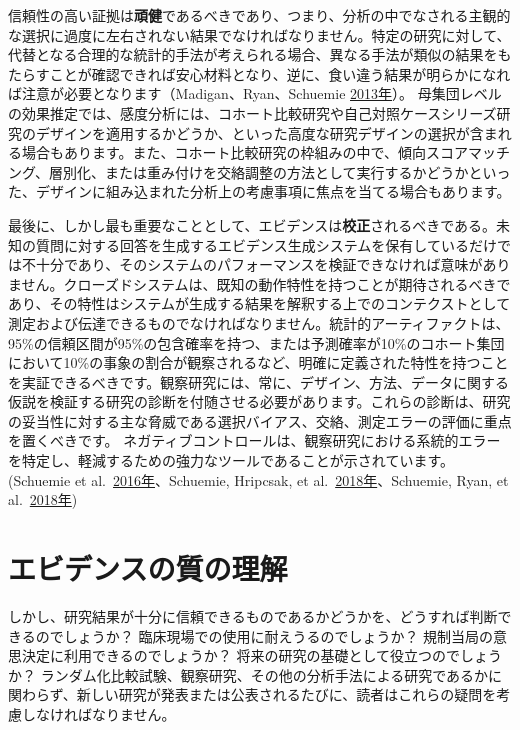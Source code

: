 \documentclass[
  11pt]{book}
\theoremstyle{definition}
\theoremstyle{definition}
\theoremstyle{definition}
\theoremstyle{definition}
\theoremstyle{remark}
\begin{document}
信頼性の高い証拠は\textbf{頑健}であるべきであり、つまり、分析の中でなされる主観的な選択に過度に左右されない結果でなければなりません。特定の研究に対して、代替となる合理的な統計的手法が考えられる場合、異なる手法が類似の結果をもたらすことが確認できれば安心材料となり、逆に、食い違う結果が明らかになれば注意が必要となります（Madigan、Ryan、Schuemie \href{https://ohdsi.github.io/TheBookOfOhdsi/EvidenceQuality.html\#ref-madigan2013design}{2013年}）。 母集団レベルの効果推定では、感度分析には、コホート比較研究や自己対照ケースシリーズ研究のデザインを適用するかどうか、といった高度な研究デザインの選択が含まれる場合もあります。また、コホート比較研究の枠組みの中で、傾向スコアマッチング、層別化、または重み付けを交絡調整の方法として実行するかどうかといった、デザインに組み込まれた分析上の考慮事項に焦点を当てる場合もあります。

最後に、しかし最も重要なこととして、エビデンスは\textbf{校正}されるべきである。未知の質問に対する回答を生成するエビデンス生成システムを保有しているだけでは不十分であり、そのシステムのパフォーマンスを検証できなければ意味がありません。クローズドシステムは、既知の動作特性を持つことが期待されるべきであり、その特性はシステムが生成する結果を解釈する上でのコンテクストとして測定および伝達できるものでなければなりません。統計的アーティファクトは、95\%の信頼区間が95\%の包含確率を持つ、または予測確率が10\%のコホート集団において10\%の事象の割合が観察されるなど、明確に定義された特性を持つことを実証できるべきです。観察研究には、常に、デザイン、方法、データに関する仮説を検証する研究の診断を付随させる必要があります。これらの診断は、研究の妥当性に対する主な脅威である選択バイアス、交絡、測定エラーの評価に重点を置くべきです。 ネガティブコントロールは、観察研究における系統的エラーを特定し、軽減するための強力なツールであることが示されています。 (Schuemie et al.~\href{https://ohdsi.github.io/TheBookOfOhdsi/EvidenceQuality.html\#ref-schuemie_2016}{2016年}、Schuemie, Hripcsak, et al.~\href{https://ohdsi.github.io/TheBookOfOhdsi/EvidenceQuality.html\#ref-schuemie_2018}{2018年}、Schuemie, Ryan, et al.~\href{https://ohdsi.github.io/TheBookOfOhdsi/EvidenceQuality.html\#ref-schuemie_2018b}{2018年})

\section{エビデンスの質の理解}\label{ux30a8ux30d3ux30c7ux30f3ux30b9ux306eux8ceaux306eux7406ux89e3}

しかし、研究結果が十分に信頼できるものであるかどうかを、どうすれば判断できるのでしょうか？ 臨床現場での使用に耐えうるのでしょうか？ 規制当局の意思決定に利用できるのでしょうか？ 将来の研究の基礎として役立つのでしょうか？ ランダム化比較試験、観察研究、その他の分析手法による研究であるかに関わらず、新しい研究が発表または公表されるたびに、読者はこれらの疑問を考慮しなければなりません。
\end{document}
